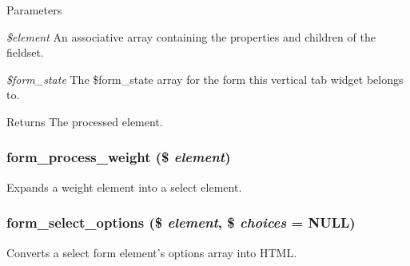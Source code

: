 \begin{DoxyParams}{Parameters}
\item[{\em \$element}]An associative array containing the properties and children of the fieldset. \item[{\em \$form\_\-state}]The \$form\_\-state array for the form this vertical tab widget belongs to.\end{DoxyParams}
\begin{DoxyReturn}{Returns}
The processed element. 
\end{DoxyReturn}
\hypertarget{group__form__api_ga8d816602aa24f851579022bb37feac42}{
\subsubsection[{form\_\-process\_\-weight}]{\setlength{\rightskip}{0pt plus 5cm}form\_\-process\_\-weight (\$ {\em element})}}
\label{group__form__api_ga8d816602aa24f851579022bb37feac42}
Expands a weight element into a select element. \hypertarget{group__form__api_ga018022f493d295538cb6d8d312dab866}{
\subsubsection[{form\_\-select\_\-options}]{\setlength{\rightskip}{0pt plus 5cm}form\_\-select\_\-options (\$ {\em element}, \/  \$ {\em choices} = {\ttfamily NULL})}}
\label{group__form__api_ga018022f493d295538cb6d8d312dab866}
Converts a select form element's options array into HTML.


